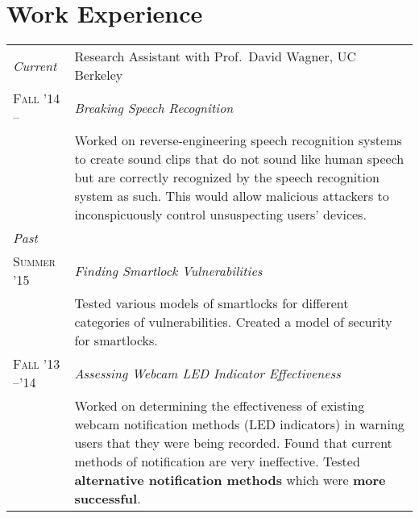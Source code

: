 \documentclass[10pt]{article}
\begin{document}
\section{Work Experience}
\begin{tabular}{R{2.5cm}p{13cm}}
  \emph{Current}          & Research Assistant with Prof.\ David Wagner, UC Berkeley\\


  \textsc{Fall '14 --}     & \emph{Breaking Speech Recognition}\\

                          &\footnotesize{%
                             Worked on reverse-engineering speech recognition
                             systems to create sound clips that do not sound
                             like human speech but are correctly recognized by
                             the speech recognition system as such. This would
                             allow malicious attackers to inconspicuously
                             control unsuspecting users’ devices.
                            }\\

  \emph{Past}             &\\
  \textsc{Summer '15}     & \emph{Finding Smartlock Vulnerabilities}\\

                          &\footnotesize{%
                             Tested various models of smartlocks for different
                             categories of vulnerabilities. Created a model of
                             security for smartlocks.

                            }\\
  \textsc{Fall '13 --'14} & \emph{Assessing Webcam LED Indicator Effectiveness}\\

                          &\footnotesize{%
                             Worked on determining the effectiveness of
                             existing webcam notification methods (LED
                             indicators) in warning users that they were being
                             recorded. Found that current methods of
                             notification are very ineffective. Tested
                             \textbf{alternative notification methods} which
                             were \textbf{more successful}.

                            }\\


\end{tabular}
\end{document}

